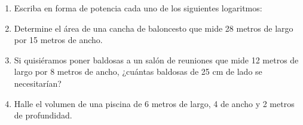 \documentclass[fleqn]{article}
\begin{document}
\begin{enumerate}
\begin{enumerate}
\begin{multicols}{2}
\end{multicols}
\end{enumerate}
\item Escriba en forma de potencia cada uno de los siguientes logaritmos:
  \begin{enumerate}
  \end{enumerate}
  \item Determine el área de una cancha de baloncesto que mide 28 metros de largo por 15 metros de ancho.\noanswer
  \item Si quisiéramos poner baldosas a un salón de reuniones que mide 12 metros de largo por 8 metros de ancho, ¿cuántas baldosas de 25 cm de lado se necesitarían?\noanswer
  \item Halle el volumen de una piscina de 6 metros de largo, 4 de ancho y 2 metros de profundidad.\noanswer
 \end{enumerate}
\end{document}

